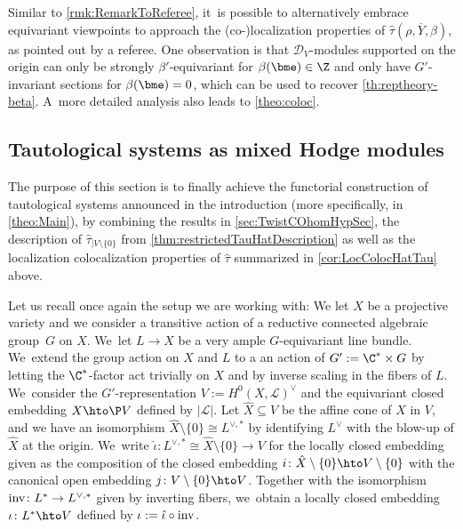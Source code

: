 \begin{rmk}\label{rmk:RemarkRefColoc}
Similar to \cref{rmk:RemarkToReferee}, it~is possible to alternatively embrace equivariant viewpoints to approach the (co-)localization properties of $\hat\tau(\rho, \overline Y, \beta)$, as pointed out by a referee. One observation is that $\mathscr D_V$\nobreakdash-mod\-ules supported on the origin can only be strongly $\beta'$-equivariant for $\beta(\bme) \in \Z$ and only have $G'$-invariant sections for $\beta(\bme) = 0$, which can be used to recover \cref{th:reptheory-beta}. A~more detailed analysis also leads to \cref{theo:coloc}.
\end{rmk}

\subsection{Tautological systems as mixed Hodge modules}
\label{subsec:TautMHM}

The purpose of this section is to finally achieve the functorial construction of tautological systems
announced in the introduction (more specifically, in \cref{theo:Main}), by combining the results in
\cref{sec:TwistCOhomHypSec}, the description of $\hat\tau_{|V\setminus \{0\}}$ from \cref{thm:restrictedTauHatDescription} as well as the localization \resp colocalization properties of $\hat\tau$ summarized in \cref{cor:LocColocHatTau} above.

Let us recall once again the setup we are working with: We let $X$ be a projective variety and we consider a transitive action of a reductive connected algebraic group~$G$ on $X$. We~let $L \to X$ be a very ample $G$-equivariant line bundle. We~extend the group action on $X$ and $L$ to a an action of $G' := \C^* \times G$ by letting the $\C^*$-factor act trivially on $X$ and by inverse scaling in the fibers of $L$. We~consider the $G'$-representation $V:=H^0(X,\mathscr{L})^\vee$ and the equivariant closed embedding $X\hto \P V$ defined by $|\mathscr{L}|$.
Let $\hat{X}\subseteq V$ be the affine cone of $X$ in $V$, and we have an isomorphism $\hat{X} \setminus \{0\} \cong L^{\vee,*}$ by identifying $L^{\vee}$ with the blow-up of $\hat X$ at the origin. We~write $\hat\iota \colon L^{\vee,*} \cong \hat X \setminus \{0\} \to V$ for the locally closed embedding given as the composition of
the closed embedding $i \colon \hat{X}\setminus \{0\} \hto V\setminus \{0\}$ with the canonical open embedding
$j \colon V\setminus \{0\} \hto V$.
Together with the isomorphism $\textup{inv} \colon L^* \to L^{\vee,*}$ given by inverting fibers, we~obtain a locally closed embedding $\iota \colon L^* \hto V$ defined by $\iota:=\hat\iota\circ \textup{inv}$.

